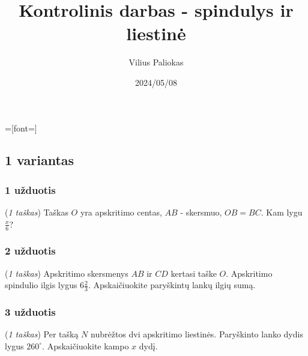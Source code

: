 \documentclass[a4paper]{article}
\title{Kontrolinis darbas - spindulys ir liestinė}
\author{Vilius Paliokas}
\date{2024/05/08}
\begin{document}
\newcommand\blankpage{%
      \null
      \thispagestyle{empty}%
      \addtocounter{page}{-1}%
      \newpage
}

\thispagestyle{fancy}

=[font=\LARGE]

\subsection*{1 variantas}
\vspace*{5mm}

\subsubsection*{1 užduotis}
\begin{minipage}[t]{0.22\textwidth}
      \centering
\end{minipage}\hfill
\begin{minipage}{0.69\textwidth}

      (\textit{1 taškas}) Taškas $O$ yra apskritimo centas, $AB$ - skersmuo,
      $OB = BC$. Kam lygu $\frac{x}{6}$?
\end{minipage}

\subsubsection*{2 užduotis}

\begin{minipage}[t]{0.22\textwidth}
      \centering
\end{minipage}\hfill
\begin{minipage}{0.69\textwidth}
      (\textit{1 taškas}) Apskritimo skersmenys $AB$ ir $CD$ kertasi taške $O$.
      Apskritimo spindulio ilgis lygus $6\frac{2}{3}$. Apskaičiuokite
      paryškintų
      lankų ilgių sumą.
\end{minipage}

\subsubsection*{3 užduotis}

\begin{minipage}[t]{0.28\textwidth}
      \centering
\end{minipage}\hfill
\begin{minipage}{0.69\textwidth}
      (\textit{1 taškas}) Per tašką $N$ nubrėžtos dvi apskritimo liestinės.
      Paryškinto lanko dydis lygus $260^\circ$. Apskaičiuokite kampo $x$ dydį.
\end{minipage}
\end{document}
